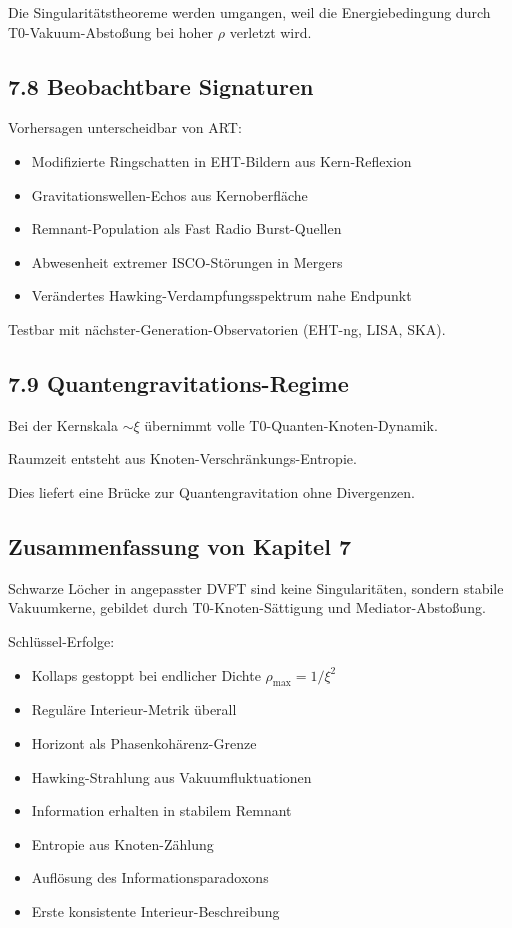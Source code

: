 	Die Singularitätstheoreme werden umgangen, weil die Energiebedingung durch T0-Vakuum-Abstoßung bei hoher $\rho$ verletzt wird.
	
	\subsection{7.8 Beobachtbare Signaturen}
	
	Vorhersagen unterscheidbar von ART:
	\begin{itemize}
		\item Modifizierte Ringschatten in EHT-Bildern aus Kern-Reflexion
		\item Gravitationswellen-Echos aus Kernoberfläche
		\item Remnant-Population als Fast Radio Burst-Quellen
		\item Abwesenheit extremer ISCO-Störungen in Mergers
		\item Verändertes Hawking-Verdampfungsspektrum nahe Endpunkt
	\end{itemize}
	
	Testbar mit nächster-Generation-Observatorien (EHT-ng, LISA, SKA).
	
	\subsection{7.9 Quantengravitations-Regime}
	
	Bei der Kernskala $\sim \xi$ übernimmt volle T0-Quanten-Knoten-Dynamik.
	
	Raumzeit entsteht aus Knoten-Verschränkungs-Entropie.
	
	Dies liefert eine Brücke zur Quantengravitation ohne Divergenzen.
	
	\subsection{Zusammenfassung von Kapitel 7}
	
	Schwarze Löcher in angepasster DVFT sind keine Singularitäten, sondern stabile Vakuumkerne, gebildet durch T0-Knoten-Sättigung und Mediator-Abstoßung.
	
	Schlüssel-Erfolge:
	\begin{itemize}
		\item Kollaps gestoppt bei endlicher Dichte $\rho_{\text{max}} = 1/\xi^2$
		\item Reguläre Interieur-Metrik überall
		\item Horizont als Phasenkohärenz-Grenze
		\item Hawking-Strahlung aus Vakuumfluktuationen
		\item Information erhalten in stabilem Remnant
		\item Entropie aus Knoten-Zählung
		\item Auflösung des Informationsparadoxons
		\item Erste konsistente Interieur-Beschreibung
	\end{itemize}
	
